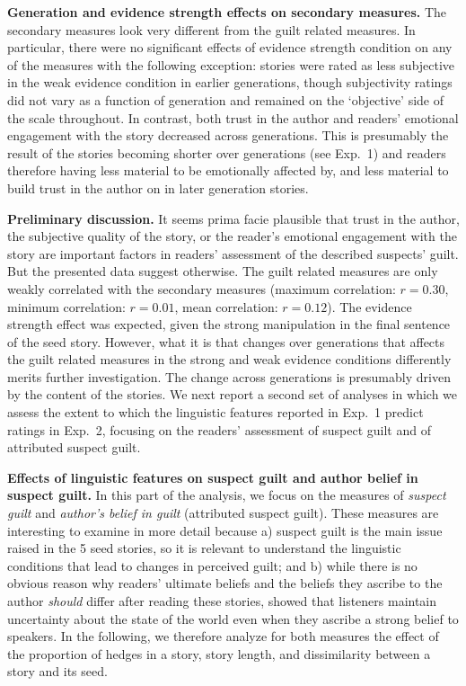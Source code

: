 \documentclass[10pt,letterpaper]{article}
\newcommand{\ek}[1]{\textcolor{Orange}{[ek: #1]}}
\begin{document}
\textbf{Generation and evidence strength effects on secondary measures.} The secondary measures look very different from the guilt related measures. In particular, there were no significant effects of evidence strength condition on any of the measures with the following exception: stories were rated as less subjective in the weak evidence condition in earlier generations, though subjectivity ratings did not vary as a function of generation and remained on the `objective' side of the scale throughout. In contrast, both trust in the author and readers' emotional engagement with the story decreased across generations. This is presumably the result of the stories becoming shorter over generations (see Exp.~1) and readers therefore having less material to be emotionally affected by, and less material to build trust in the author on in later generation stories.

\textbf{Preliminary discussion.} It seems prima facie plausible that trust in the author, the subjective quality of the story, or the reader's emotional engagement with the story are important factors in readers' assessment of the described suspects' guilt. But the presented data suggest otherwise. The guilt related measures are only weakly correlated with the secondary measures (maximum correlation: $r = 0.30$, minimum correlation: $r = 0.01$, mean correlation: $r = 0.12$). %
The evidence strength effect was expected, given the strong manipulation in the final sentence of the seed story. However, what it is that changes over generations that affects the guilt related measures in the strong and weak evidence conditions differently merits further investigation. The change across generations is presumably driven by the content of the stories. We next report a second set of analyses  in which we assess the extent to which the linguistic features reported in Exp.~1 predict ratings in Exp.~2, focusing on the readers' assessment of suspect guilt and of attributed suspect guilt.

\textbf{Effects of linguistic features on suspect guilt and author belief in suspect guilt.} 
 In this part of the analysis, we focus on the measures of \textit{suspect guilt} and \textit{author's belief in guilt} (attributed suspect guilt). These measures are interesting to examine in more detail because a) suspect guilt is the main issue raised in the 5 seed stories, so it is relevant to understand the linguistic conditions that lead to changes in perceived guilt; and b) while there is no obvious reason why readers' ultimate beliefs and the beliefs they ascribe to the author \emph{should} differ after reading these stories,  showed that listeners maintain uncertainty about the state of the world even when they ascribe a strong belief to speakers. In the following, we therefore analyze for both measures the effect of the proportion of hedges in a story, story length, and dissimilarity between a story and its seed.
\end{document}
